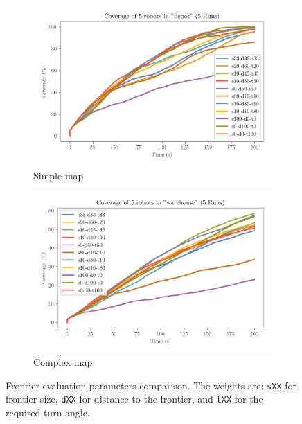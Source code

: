\begin{figure}[H]
    \centering
    \begin{subfigure}[b]{0.49\textwidth}
        \centering
        \includegraphics[width=\textwidth]{figures/frontier_eval_params_depot.png}
        \caption{Simple map}
    \end{subfigure}
    \begin{subfigure}[b]{0.49\textwidth}
        \centering
        \includegraphics[width=\textwidth]{figures/frontier_eval_params_warehouse.png}
        \caption{Complex map}
    \end{subfigure}
    \caption{Frontier evaluation parameters comparison. The weights are: \texttt{sXX} for frontier size, \texttt{dXX} for distance to the frontier, and \texttt{tXX} for the required turn angle.}
    \label{fig:frontier-eval-params}
\end{figure}

